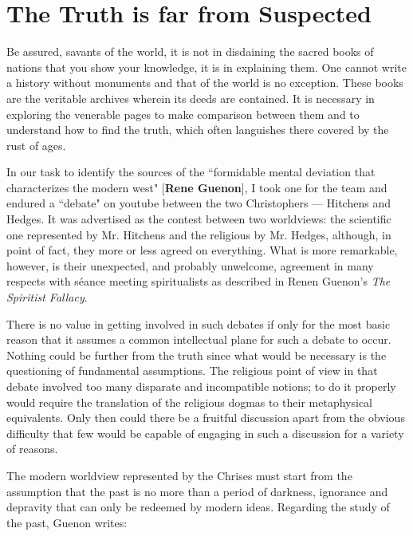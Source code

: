 \section{The Truth is far from Suspected}

\label{sec:TruthSuspected}

\begin{quotex}
Be assured, savants of the world, it is not in disdaining the sacred books of nations that you show your knowledge, it is in explaining them. One cannot write a history without monuments and that of the world is no exception. These books are the veritable archives wherein its deeds are contained. It is necessary in exploring the venerable pages to make comparison between them and to understand how to find the truth, which often languishes there covered by the rust of ages. 

\end{quotex}
In our task to identify the sources of the ``formidable mental deviation that characterizes the modern west" [\textbf{Rene Guenon}], I took one for the team and endured a ``debate" on youtube between the two Christophers — Hitchens and Hedges. It was advertised as the contest between two worldviews: the scientific one represented by Mr. Hitchens and the religious by Mr. Hedges, although, in point of fact, they more or less agreed on everything. What is more remarkable, however, is their unexpected, and probably unwelcome, agreement in many respects with séance meeting spiritualists as described in Renen Guenon's \textit{The Spiritist Fallacy}.

There is no value in getting involved in such debates if only for the most basic reason that it assumes a common intellectual plane for such a debate to occur. Nothing could be further from the truth since what would be necessary is the questioning of fundamental assumptions. The religious point of view in that debate involved too many disparate and incompatible notions; to do it properly would require the translation of the religious dogmas to their metaphysical equivalents. Only then could there be a fruitful discussion apart from the obvious difficulty that few would be capable of engaging in such a discussion for a variety of reasons.

The modern worldview represented by the Chrises must start from the assumption that the past is no more than a period of darkness, ignorance and depravity that can only be redeemed by modern ideas. Regarding the study of the past, Guenon writes:

